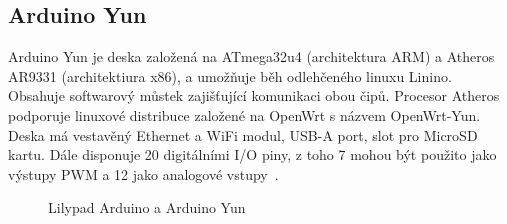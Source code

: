 	\subsection{Arduino Yun} 
	Arduino Yun je deska založená na ATmega32u4 (architektura ARM) a Atheros AR9331 (architektiura x86), a umožňuje běh odlehčeného linuxu Linino. Obsahuje softwarový můstek zajišťující komunikaci obou čipů. Procesor Atheros podporuje linuxové distribuce založené na OpenWrt s názvem OpenWrt-Yun. Deska má vestavěný Ethernet a WiFi modul, USB-A port, slot pro MicroSD kartu. Dále disponuje 20 digitálními I/O piny, z toho 7 mohou být použito jako výstupy PWM a 12 jako analogové vstupy~\cite{ArduinoYun}.	

	\begin{figure}[!ht]
    \centering
			\hspace*{5mm}
			\caption{Lilypad Arduino a Arduino Yun}
			\vspace{-10pt}	
\end{figure}
	

